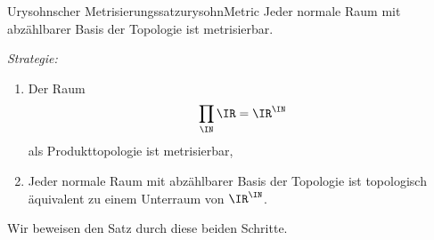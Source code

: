 \documentclass[language=ngerman]{TemplateLecture} %
\begin{document}
\begin{thm}{Urysohnscher Metrisierungssatz}{urysohnMetric}
    Jeder normale Raum mit abzählbarer Basis der Topologie ist metrisierbar.
\end{thm}
\emph{Strategie:} 
\begin{enumerate}
    \item Der Raum 
    \begin{equation*}
        \prod_\IN \IR = \IR^\IN
    \end{equation*}
    als Produkttopologie ist metrisierbar,
    \item Jeder normale Raum mit abzählbarer Basis der Topologie ist topologisch äquivalent zu einem Unterraum von $\IR^\IN$.
\end{enumerate}

Wir beweisen den Satz durch diese beiden Schritte.
\end{document}

